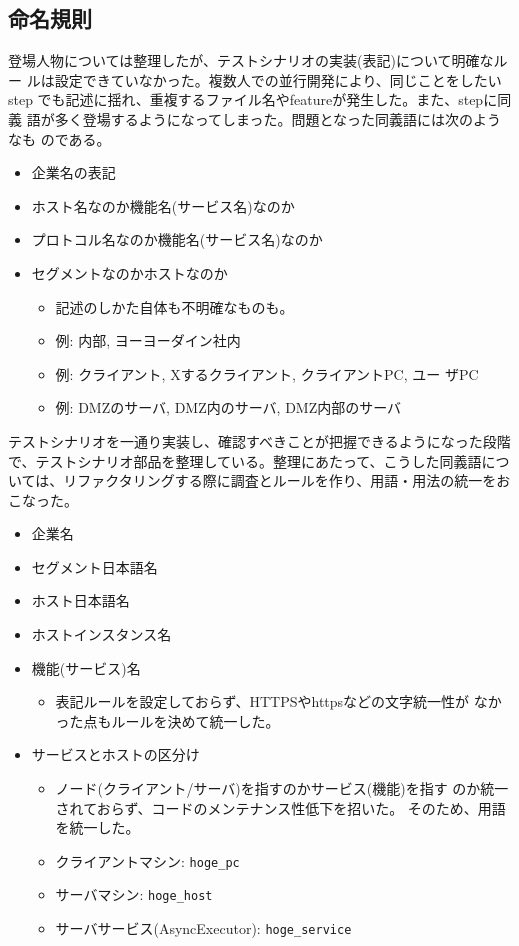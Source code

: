 \subsection{命名規則}
登場人物については整理したが、テストシナリオの実装(表記)について明確なルー
ルは設定できていなかった。複数人での並行開発により、同じことをしたいstep
でも記述に揺れ、重複するファイル名やfeatureが発生した。また、stepに同義
語が多く登場するようになってしまった。問題となった同義語には次のようなも
のである。
\begin{itemize}
 \item 企業名の表記
 \item ホスト名なのか機能名(サービス名)なのか
 \item プロトコル名なのか機能名(サービス名)なのか
 \item セグメントなのかホストなのか
       \begin{itemize}
        \item 記述のしかた自体も不明確なものも。
        \item 例: 内部, ヨーヨーダイン社内
        \item 例: クライアント, Xするクライアント, クライアントPC, ユー
              ザPC
        \item 例: DMZのサーバ, DMZ内のサーバ, DMZ内部のサーバ
       \end{itemize}
\end{itemize}
テストシナリオを一通り実装し、確認すべきことが把握できるようになった段階
で、テストシナリオ部品を整理している。整理にあたって、こうした同義語につ
いては、リファクタリングする際に調査とルールを作り、用語・用法の統一をお
こなった。
\begin{itemize}
 \item 企業名
 \item セグメント日本語名
 \item ホスト日本語名
 \item ホストインスタンス名
 \item 機能(サービス)名
       \begin{itemize}
        \item 表記ルールを設定しておらず、HTTPSやhttpsなどの文字統一性が
              なかった点もルールを決めて統一した。
       \end{itemize}
 \item サービスとホストの区分け
       \begin{itemize}
        \item ノード(クライアント/サーバ)を指すのかサービス(機能)を指す
              のか統一されておらず、コードのメンテナンス性低下を招いた。
              そのため、用語を統一した。
        \item クライアントマシン: \verb|hoge_pc|
        \item サーバマシン: \verb|hoge_host|
        \item サーバサービス(AsyncExecutor): \verb|hoge_service|
       \end{itemize}
\end{itemize}

